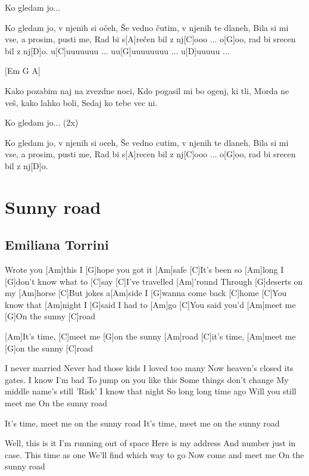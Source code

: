 \documentclass[a4paper,12pt]{article}
\begin{document}
\begin{multicols}{2}
\begin{guitar}
Ko gledam jo...

                
Ko gledam jo, v njenih si očeh,
Še vedno čutim, v njenih te dlaneh,
Bila si mi vse, a prosim, pusti me,
Rad bi s[A]rečen bil z nj[C]ooo     ...  o[G]oo, 
rad bi srecen bil z nj[D]o.
u[C]uuuuuuu ... uu[G]uuuuuuuu ... u[D]uuuuu ...


[Em  G  A]           

Kako pozabim naj na zvezdne noci,
Kdo pogasil mi bo ogenj, ki tli,
Morda ne veš, kako lahko boli,
Sedaj ko tebe vec ni.


Ko gledam jo... (2x)


Ko gledam jo, v njenih si oceh,
Še vedno cutim, v njenih te dlaneh,
Bila si mi vse, a prosim, pusti me,
Rad bi s[A]recen bil z nj[C]ooo  ...  o[G]oo, 
rad bi srecen bil z nj[D]o.


\end{guitar}
\section{Sunny road}
\subsection*{Emiliana Torrini}
\begin{guitar}
[C]Wrote you [Am]this
I [G]hope you got it [Am]safe
[C]It's been so [Am]long
I [G]don't know what to [C]say
[C]I've travelled [Am]'round
Through [G]deserts on my [Am]horse
[C]But jokes a[Am]side
I [G]wanna come back [C]home
[C]You know that [Am]night
I [G]said I had to [Am]go
[C]You said you'd [Am]meet me
[G]On the sunny [C]road



[Am]It's time, [C]meet me [G]on the sunny [Am]road
[C]it's time, [Am]meet me [G]on the sunny [C]road



I never married
Never had those kids
I loved too many
Now heaven's closed its gates.
I know I'm bad
To jump on you like this
Some things don't change
My middle name's still 'Risk'
I know that night
So long long time ago
Will you still meet me
On the sunny road



It's time, meet me on the sunny road
It's time, meet me on the sunny road



Well, this is it
I'm running out of space
Here is my address
And number just in case.
This time as one
We'll find which way to go
Now come and meet me
On the sunny road



\end{guitar}
\end{multicols}
\end{document}
